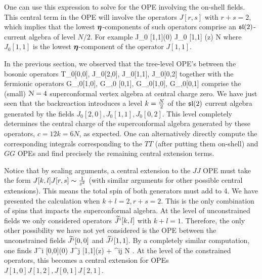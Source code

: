 \documentclass[../main.tex]{subfiles}
\begin{document}
One can use this expression to solve for the OPE involving the on-shell fields.
This central term in the OPE will involve the operators $J[r,s]$ with $r + s = 2$,
which implies that the lowest $\boldsymbol\eta$-components of such operators comprise an $\mathfrak{sl}(2)$-current algebra of level $N/2$.
For example
\beqn
J_0 [1,1](0) J_0 [1,1] (z) \simeq {} {N }
\eeqn
where $J_0[1,1]$ is the lowest $\boldsymbol\eta$-component of the operator $J[1,1]$.

In the previous section, we observed that the tree-level OPE's between the bosonic operators 
\beqn
T_0[0,0], J_0[2,0], J_0[1,1], J_0[0,2]
\eeqn
together with the fermionic operators
\beqn
G_{\alpha,0}[1,0], G_{\alpha,0} [0,1], G_{\gamma,0}[1,0], G_{\gamma,0}[0,1]
\eeqn
comprise the (small) $\mathcal{N}=4$ superconformal vertex algebra at central charge zero.
We have just seen that the backreaction introduces a level $k = {N \over 2}$ of the $\mathfrak{sl}(2)$ current algebra generated by the fields $J_0[2,0], J_0[1,1], J_0[0,2]$.
This level completely determines the central charge of the superconformal algebra generated by these operators, $c = 12 k = 6 N$, as expected. 
One can alternatively directly compute the corresponding integrals corresponding to the $TT$ (after putting them on-shell) and $GG$ OPEs and find precisely the remaining central extension terms. 


Notice that by scaling arguments, a central extension to the $JJ$ OPE must take the form $J[k, l]J[r, s] \sim {1 \over z^2}$ (with similar arguments for other possible central extensions). This means the total spin of both generators must add to 4. 
We have presented the calculation when $k + l =2, r + s =2$. 
This is the only combination of spins that impacts the superconformal algebra. 
At the level of unconstrained fields we only considered operators $\widetilde J^i [k,l]$ with $k+l = 1$.
Therefore, the only other possibility we have not yet considered is the OPE between the unconstrained fields $\widetilde J^i [0,0]$ and $\widetilde J^j [1,1]$.
By a completely similar computation, one finds
\beqn
\til J^i [0,0](0) \til J^j [1,1](z) \simeq \cdots + \eps^{ij}  N .
\eeqn
At the level of the constrained operators, this becomes a central extension for OPEs $J[1, 0]J[1, 2], J[0, 1]J[2, 1]$.
\end{document}

